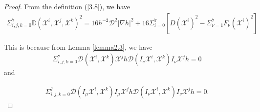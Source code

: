 \documentclass[10pt,a4paper]{amsart}
\numberwithin{equation}{section}
\begin{document}
\begin{proof}
   

From the definition (\ref{3.8}), we have
\begin{align}\label{*}
    \Sigma_{i,j,k=0}^7\mathbb{D}(\mathscr{X}^i,\mathscr{X}^j,\mathscr{X}^k)^2=16h^{-2}\mathcal{D}^2|\nabla h|^2+16\Sigma_{i=0}^7[D(\mathscr{X}^i)^2-\Sigma_{\nu=1}^7F_\nu(\mathscr{X}^i)^2]
\end{align}

This is because from Lemma \ref{lemma2.3}, we have
\begin{align*}
    \Sigma_{i,j,k=0}^7 \mathcal{D}(\mathscr{X}^i,\mathscr{X}^k)\mathscr{X}^j h\mathcal{D}(I_\nu\mathscr{X}^i,\mathscr{X}^k)I_\nu\mathscr{X}^j h=0\end{align*}
and 

\begin{align*}
    \Sigma_{i,j,k=0}^7 \mathcal{D}(I_\mu\mathscr{X}^i,\mathscr{X}^k)I_\mu\mathscr{X}^j h\mathcal{D}(I_\nu\mathscr{X}^i,\mathscr{X}^k)I_\nu\mathscr{X}^j h=0.\end{align*}


\end{proof}
\end{document}
